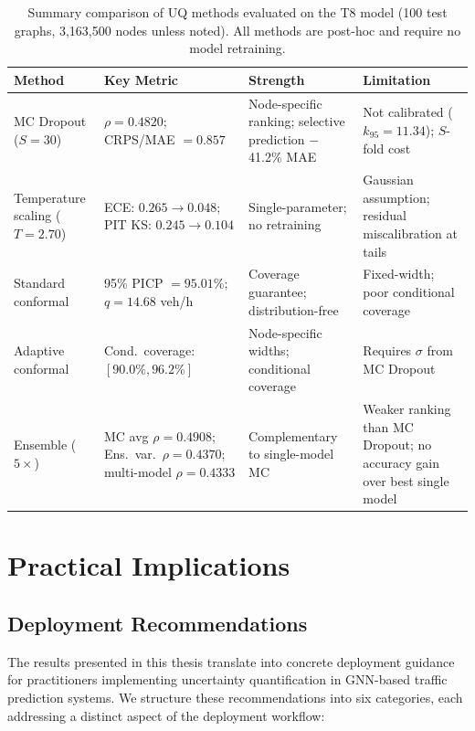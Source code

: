 \begin{table}[htbp]
\centering
\caption[Summary comparison of UQ methods evaluated in this thesis]{Summary comparison of UQ methods evaluated on the T8 model (100 test graphs, 3,163,500 nodes unless noted). All methods are post-hoc and require no model retraining.}
\label{tab:uq_summary}
\footnotesize
\begin{tabular}{p{2.2cm} p{2.8cm} p{2.6cm} p{3.0cm}}
\toprule
\textbf{Method} & \textbf{Key Metric} & \textbf{Strength} & \textbf{Limitation} \\
\midrule
MC Dropout ($S\!=\!30$) & $\rho = 0.4820$; CRPS/MAE $= 0.857$ & Node-specific ranking; selective prediction $-$41.2\% MAE & Not calibrated ($k_{95} = 11.34$); $S$-fold cost \\[4pt]
Temperature scaling ($T\!=\!2.70$) & ECE: $0.265 \to 0.048$; PIT KS: $0.245 \to 0.104$ & Single-parameter; no retraining & Gaussian assumption; residual miscalibration at tails \\[4pt]
Standard conformal & 95\% PICP $= 95.01\%$; $q = 14.68$ veh/h & Coverage guarantee; distribution-free & Fixed-width; poor conditional coverage \\[4pt]
Adaptive conformal & Cond.\ coverage: $[90.0\%, 96.2\%]$ & Node-specific widths; conditional coverage & Requires $\sigma$ from MC Dropout \\[4pt]
Ensemble ($5\times$) & MC avg $\rho = 0.4908$; Ens.\ var.\ $\rho = 0.4370$; multi-model $\rho = 0.4333$ & Complementary to single-model MC & Weaker ranking than MC Dropout; no accuracy gain over best single model \\
\bottomrule
\end{tabular}
\end{table}

\section{Practical Implications}

\subsection{Deployment Recommendations}

The results presented in this thesis translate into concrete deployment guidance for practitioners implementing uncertainty quantification in GNN-based traffic prediction systems. We structure these recommendations into six categories, each addressing a distinct aspect of the deployment workflow:

